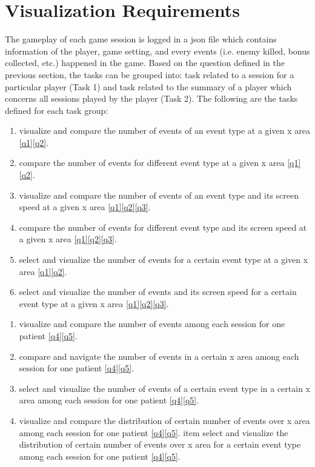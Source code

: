 \section{Visualization Requirements}

The gameplay of each game session is logged in a json file which contains information of the player, game setting, and every events (i.e. enemy killed, bonus collected, etc.) happened in the game. Based on the question defined in the previous section, the tasks can be grouped into: task related to a session for a particular player (Task 1) and task related to the summary of a player which concerns all sessions played by the player (Task 2). The following are the tasks defined for each task group:
\newcommand{\task}[2]{$#1 #2$}
\begin{enumerate}[label=\textbf{(\task{T1.}{\arabic*})}]
\item visualize and compare the number of events of an event type at a given x area \ref{q1}\ref{q2}.
\item compare the number of events for different event type at a given x area  \ref{q1}\ref{q2}.
\item visualize and compare the number of events of an event type and its screen speed at a given x area \ref{q1}\ref{q2}\ref{q3}.
\item compare the number of events for different event type and its screen speed at a given x area \ref{q1}\ref{q2}\ref{q3}.
\item select and visualize the number of events for a certain event type at a given x area \ref{q1}\ref{q2}.
\item select and visualize the number of events and its screen speed for a certain event type at a given x area \ref{q1}\ref{q2}\ref{q3}.
\end{enumerate}

\newcommand{\test}[2]{$#1 #2$}
\begin{enumerate}[label=\textbf{(\test{T2.}{\arabic*})}]
\item visualize and compare the number of events among each session for one patient \ref{q4}\ref{q5}.
\item compare and navigate the number of events in a certain x area among each session for one patient \ref{q4}\ref{q5}.
\item select and visualize the number of events of a certain event type in a certain x area among each session for one patient \ref{q4}\ref{q5}.
\item visualize and compare the distribution of certain number of events over x area among each session for one patient \ref{q4}\ref{q5}.
item select and visualize the distribution of certain number of events over x area for a certain event type among each session for one patient \ref{q4}\ref{q5}.
\end{enumerate}
